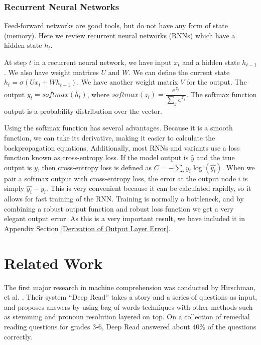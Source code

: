 \documentclass[pageno]{final_paper}
\begin{document}
\subsubsection{Recurrent Neural Networks}
\label{Recurrent Neural Networks}

Feed-forward networks are good tools, but do not have any form of state
(memory). Here we review recurrent neural networks (RNNs) which have a hidden
state $h_t$.

At step $t$ in a recurrent neural network, we have input $x_t$ and a hidden
state $h_{t-1}$. We also have weight matrices $U$ and $W$. We can define the
current state $h_t = \sigma(Ux_t + Wh_{t-1})$. We have another weight matrix $V$
for the output. The output $y_t = softmax(h_t)$, where $softmax(z_i) =
\dfrac{e^{z_i}}{\sum_j e^{z_j}}$. The softmax function output is a probability
distribution over the vector.

Using the softmax function has several advantages. Because it is a smooth
function, we can take its derivative, making it easier to calculate the
backpropagation equations. Additionally, most RNNs and variants use a loss
function known as cross-entropy loss. If the model output is $\hat{y}$ and the
true output is $y$, then cross-entropy loss is defined as $C = -\sum_i y_i
\log(\hat{y_{i}})$. When we pair a softmax output with cross-entropy loss, the
error at the output node $i$ is simply $\hat{y_i} - y_i$. This is very
convenient because it can be calculated rapidly, so it allows for fast training
of the RNN. Training is normally a bottleneck, and by combining a robust output
function and robust loss function we get a very elegant output error. As this is
a very important result, we have included it in Appendix Section \ref{Derivation
of Output Layer Error}.

\section{Related Work}
\label{Related Work}

The first major research in machine comprehension was conducted by Hirschman, et
al. \cite{Hirschman1999}. Their system ``Deep Read'' takes a story and a series
of questions as input, and proposes answers by using bag-of-words techniques
with other methods such as stemming and pronoun resolution layered on top. On a
collection of remedial reading questions for grades 3-6, Deep Read answered
about 40\% of the questions correctly.
\end{document}
